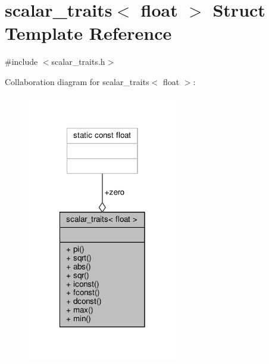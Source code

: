 \hypertarget{structscalar__traits_3_01float_01_4}{\section{scalar\-\_\-traits$<$ float $>$ Struct Template Reference}
\label{structscalar__traits_3_01float_01_4}
}


{\ttfamily \#include $<$scalar\-\_\-traits.\-h$>$}



Collaboration diagram for scalar\-\_\-traits$<$ float $>$\-:
\nopagebreak
\begin{figure}[H]
\begin{center}
\leavevmode
\includegraphics[width=186pt]{structscalar__traits_3_01float_01_4__coll__graph}
\end{center}
\end{figure}
